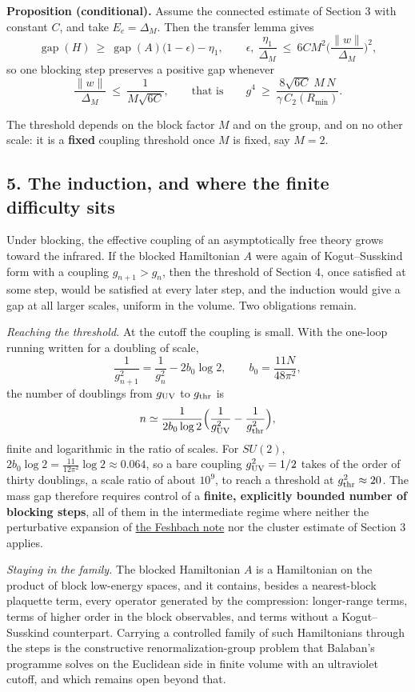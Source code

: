 \documentclass[11pt,a4paper]{article}
\begin{document}
\textbf{Proposition (conditional).} Assume the connected estimate of
Section 3 with constant \(C\), and take \(E_c=\Delta_M\). Then the
transfer lemma gives
\[\operatorname{gap}(H)\ \ge\ \operatorname{gap}(A)\Big(1-\epsilon\Big)-\eta_1,
\qquad \epsilon,\ \frac{\eta_1}{\Delta_M}\ \le\ 6CM^2\Big(\frac{\|w\|}{\Delta_M}\Big)^2,\]
so one blocking step preserves a positive gap whenever
\[\frac{\|w\|}{\Delta_M}\ \le\ \frac1{M\sqrt{6C}},
\qquad\text{that is}\qquad
g^4\ \ge\ \frac{8\sqrt{6C}\;M\,N}{\gamma\,C_2(R_{\min})} .\]

The threshold depends on the block factor \(M\) and on the group, and on
no other scale: it is a \textbf{fixed} coupling threshold once \(M\) is
fixed, say \(M=2\).

\hypertarget{the-induction-and-where-the-finite-difficulty-sits}{%
\subsection{5. The induction, and where the finite difficulty
sits}\label{the-induction-and-where-the-finite-difficulty-sits}}

Under blocking, the effective coupling of an asymptotically free theory
grows toward the infrared. If the blocked Hamiltonian \(A\) were again
of Kogut--Susskind form with a coupling \(g_{n+1}>g_n\), then the
threshold of Section 4, once satisfied at some step, would be satisfied
at every later step, and the induction would give a gap at all larger
scales, uniform in the volume. Two obligations remain.

\emph{Reaching the threshold.} At the cutoff the coupling is small. With
the one-loop running written for a doubling of scale,
\[\frac1{g_{n+1}^2}=\frac1{g_n^2}-2b_0\log2,\qquad b_0=\frac{11N}{48\pi^2},\]
the number of doublings from \(g_{\rm UV}\) to \(g_{\rm thr}\) is
\[n\simeq\frac{1}{2b_0\log2}\Big(\frac1{g_{\rm UV}^2}-\frac1{g_{\rm thr}^2}\Big),\]
finite and logarithmic in the ratio of scales. For \(SU(2)\),
\(2b_0\log2=\tfrac{11}{12\pi^2}\log2\approx0.064\), so a bare coupling
\(g_{\rm UV}^2=1/2\) takes of the order of thirty doublings, a scale
ratio of about \(10^9\), to reach a threshold at
\(g_{\rm thr}^2\approx20\). The mass gap therefore requires control of a
\textbf{finite, explicitly bounded number of blocking steps}, all of
them in the intermediate regime where neither the perturbative expansion
of \href{weak-coupling-feshbach-reduction.md}{the Feshbach note} nor the
cluster estimate of Section 3 applies.

\emph{Staying in the family.} The blocked Hamiltonian \(A\) is a
Hamiltonian on the product of block low-energy spaces, and it contains,
besides a nearest-block plaquette term, every operator generated by the
compression: longer-range terms, terms of higher order in the block
observables, and terms without a Kogut--Susskind counterpart. Carrying a
controlled family of such Hamiltonians through the steps is the
constructive renormalization-group problem that Balaban's programme
solves on the Euclidean side in finite volume with an ultraviolet
cutoff, and which remains open beyond that.
\end{document}
